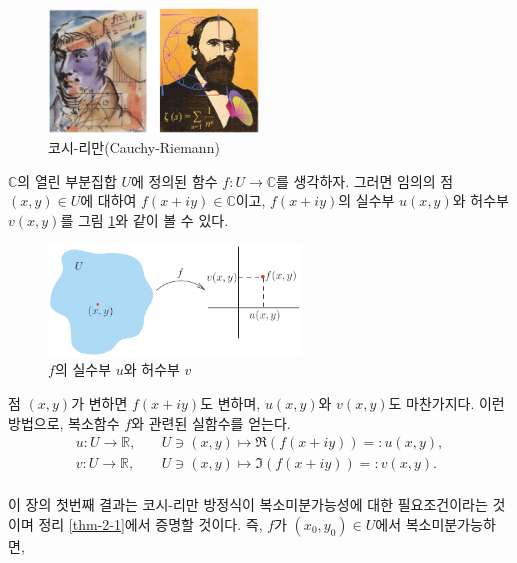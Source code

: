 \begin{figure}[!h]
\begin{center}
\includegraphics[width=0.5\textwidth]{./SaltChapter/figs/fig-2-0-1} \\
{코시-리만(Cauchy-Riemann)}
\end{center}
\end{figure}


$\mathbb C$의 열린 부분집합 $U$에 정의된
함수 $f:U\to \mathbb C$를 생각하자.
그러면 임의의 점 $(x,y)\in U$에 대하여 $f(x+iy)\in\mathbb C$이고,
$f(x+iy)$의 실수부 $u(x,y)$와 허수부 $v(x,y)$를 그림 \ref{fig-2-5}와 같이 볼 수 있다.

\begin{figure}[!h]
\begin{center}
\includegraphics[width=0.6\textwidth]{./SaltChapter/figs/fig-2-5}
\end{center}
\caption{$f$의 실수부 $u$와 허수부 $v$}
\label{fig-2-5}
\end{figure}

점 $(x,y)$가 변하면 $f(x+iy)$도 변하며, $u(x,y)$와 $v(x,y)$도 마찬가지다.
이런 방법으로, 복소함수 $f$와 관련된 실함수를 얻는다.
\begin{align*}
u:U\to \mathbb R, \quad& U \ni (x,y) \mapsto \Re(f(x+iy)) =: u(x,y), \\
v:U\to \mathbb R, \quad& U \ni (x,y) \mapsto \Im(f(x+iy)) =: v(x,y). \\
\end{align*}

이 장의 첫번째 결과는 코시-리만 방정식이 복소미분가능성에 대한 필요조건이라는 것이며
정리 \ref{thm-2-1}에서 증명할 것이다. 
즉, $f$가 $(x_0, y_0) \in U$에서 복소미분가능하면,

